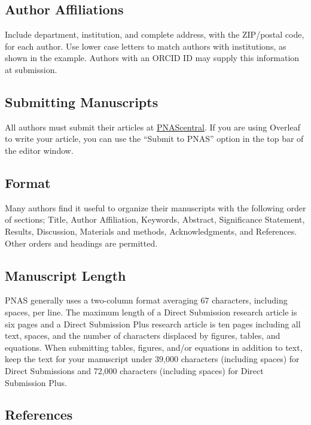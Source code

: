 \documentclass[9pt,twocolumn,twoside,lineno]{pnas-new}
\begin{document}
\subsection*{Author Affiliations}

Include department, institution, and complete address, with the ZIP/postal code, for each author. Use lower case letters to match authors with institutions, as shown in the example. Authors with an ORCID ID may supply this information at submission.

\subsection*{Submitting Manuscripts}

All authors must submit their articles at \href{http://www.pnascentral.org/cgi-bin/main.plex}{PNAScentral}. If you are using Overleaf to write your article, you can use the ``Submit to PNAS'' option in the top bar of the editor window. 

\subsection*{Format}

Many authors find it useful to organize their manuscripts with the following order of sections;  Title, Author Affiliation, Keywords, Abstract, Significance Statement, Results, Discussion, Materials and methods, Acknowledgments, and References. Other orders and headings are permitted.

\subsection*{Manuscript Length}

PNAS generally uses a two-column format averaging 67 characters, including spaces, per line. The maximum length of a Direct Submission research article is six pages and a Direct Submission Plus research article is ten pages including all text, spaces, and the number of characters displaced by figures, tables, and equations.  When submitting tables, figures, and/or equations in addition to text, keep the text for your manuscript under 39,000 characters (including spaces) for Direct Submissions and 72,000 characters (including spaces) for Direct Submission Plus.

\subsection*{References}
\end{document}
